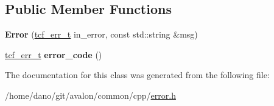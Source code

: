 \subsection*{Public Member Functions}
\begin{DoxyCompactItemize}
\item 
\mbox{\label{classtcf_1_1error_1_1Error_a9cd650c52a11da0990659da4823d0738}} 
{\bfseries Error} (\hyperlink{tcf__error_8h_a60f371a45c03875cdb1d52e2ec004fab}{tcf\+\_\+err\+\_\+t} in\+\_\+error, const std\+::string \&msg)
\item 
\mbox{\label{classtcf_1_1error_1_1Error_a056b12c6820e3a3f8815ed3fbf3d4a3e}} 
\hyperlink{tcf__error_8h_a60f371a45c03875cdb1d52e2ec004fab}{tcf\+\_\+err\+\_\+t} {\bfseries error\+\_\+code} ()
\end{DoxyCompactItemize}


The documentation for this class was generated from the following file\+:\begin{DoxyCompactItemize}
\item 
/home/dano/git/avalon/common/cpp/\hyperlink{error_8h}{error.\+h}\end{DoxyCompactItemize}
